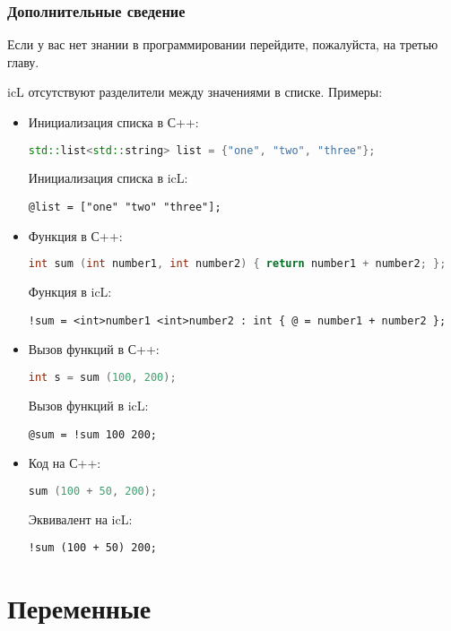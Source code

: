 \documentclass[a4paper, 14pt]{extarticle}
\newenvironment{icItems}
	{ \begin{itemize} [noitemsep,nolistsep] }
	{ \end{itemize} }
\begin{document}
\subsubsection{Дополнительные сведение}
	
Если у вас нет знании в программировании перейдите, пожалуйста, на третью главу.
	
icL отсутствуют разделители между значениями в списке. Примеры:

\begin{icItems}
	\item Инициализация списка в С++:
\begin{lstlisting}[numbers=none, language=C++]
std::list<std::string> list = {"one", "two", "three"};
\end{lstlisting}
	Инициализация списка в icL:
\begin{lstlisting}[numbers=none]
@list = ["one" "two" "three"];
\end{lstlisting}
	\item Функция в С++:
\begin{lstlisting}[numbers=none, language=C++]
int sum (int number1, int number2) { return number1 + number2; };
\end{lstlisting}
	Функция в icL:
\begin{lstlisting}[numbers=none]
!sum = <int>number1 <int>number2 : int { @ = number1 + number2 };
\end{lstlisting}
	\item Вызов функций в С++:
\begin{lstlisting}[numbers=none, language=C++]
int s = sum (100, 200);
\end{lstlisting}
	Вызов функций в icL:
\begin{lstlisting}[numbers=none]
@sum = !sum 100 200;
\end{lstlisting}
	\item Код на С++:
\begin{lstlisting}[numbers=none, language=C++]
sum (100 + 50, 200);
\end{lstlisting}
	Эквивалент на icL:
\begin{lstlisting}[numbers=none]
!sum (100 + 50) 200;
\end{lstlisting}
\end{icItems}

\newpage
\section{Переменные}  
	
\end{document}
